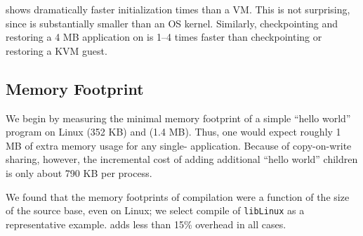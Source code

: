 \graphene{} shows dramatically faster initialization times than a VM. This is not surprising,
since \graphene{} is substantially smaller than an OS kernel. 
Similarly, checkpointing and restoring a 4 MB application on \graphene{} is 1--4 times faster than checkpointing or restoring a KVM guest.




\subsection{Memory Footprint}
\label{sec:graphene:eval:mem}

We begin by measuring the minimal memory footprint of a simple ``hello world'' program 
on Linux (352 KB) and \graphene{} (1.4 MB).
Thus, one would expect roughly 1 MB of extra memory usage for any single-\picoproc{} application.
Because of copy-on-write sharing, however, the incremental cost of adding additional ``hello world'' children
is only about 790 KB per process.

%


We found that the memory footprints of compilation were a function of the 
size of the source base, even on Linux; we select compile of {\tt libLinux} as a representative example.
\graphene{} adds less than 15\% overhead in all cases.

